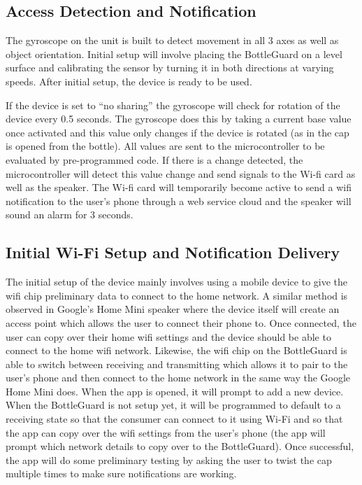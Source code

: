\documentclass[12pt]{article}
\begin{document}
	\subsection*{Access Detection and Notification}
	The gyroscope on the unit is built to detect movement in all 3 axes as well as object orientation. Initial setup will involve placing the BottleGuard on a level surface and calibrating the sensor by turning it in both directions at varying speeds. After initial setup, the device is ready to be used. 
	
	If the device is set to “no sharing” the gyroscope will check for rotation of the device every 0.5 seconds. The gyroscope does this by taking a current base value once activated and this value only changes if the device is rotated (as in the cap is opened from the bottle). All values are sent to the microcontroller to be evaluated by pre-programmed code. If there is a change detected, the microcontroller will detect this value change and send signals to the Wi-fi card as well as the speaker. The Wi-fi card will temporarily become active to send a wifi notification to the user’s phone through a web service cloud and the speaker will sound an alarm for 3 seconds. 
	
	\subsection*{Initial Wi-Fi Setup and Notification Delivery}
	The initial setup of the device mainly involves using a mobile device to give the wifi chip preliminary data to connect to the home network. A similar method is observed in Google’s Home Mini speaker where the device itself will create an access point which allows the user to connect their phone to. Once connected, the user can copy over their home wifi settings and the device should be able to connect to the home wifi network. Likewise, the wifi chip on the BottleGuard is able to switch between receiving and transmitting which allows it to pair to the user’s phone and then connect to the home network in the same way the Google Home Mini does. When the app is opened, it will prompt to add a new device. When the BottleGuard is not setup yet, it will be programmed to default to a receiving state so that the consumer can connect to it using Wi-Fi and so that the app can copy over the wifi settings from the user’s phone (the app will prompt which network details to copy over to the BottleGuard). Once successful, the app will do some preliminary testing by asking the user to twist the cap multiple times to make sure notifications are working.
	
\end{document}
